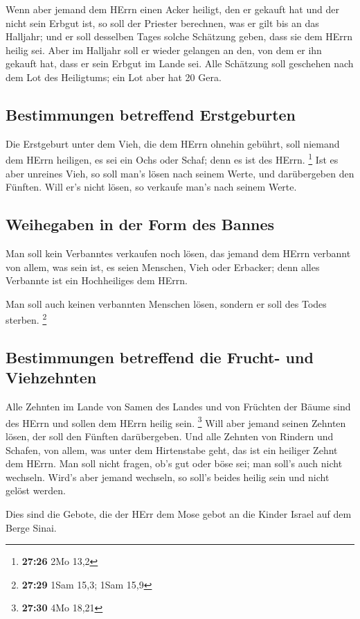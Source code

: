  Wenn aber jemand dem HErrn einen Acker heiligt, den er
gekauft hat und der nicht sein Erbgut ist,  so soll der
Priester berechnen, was er gilt bis an das Halljahr; und er soll
desselben Tages solche Schätzung geben, dass sie dem HErrn heilig sei.
 Aber im Halljahr soll er wieder gelangen an den, von dem
er ihn gekauft hat, dass er sein Erbgut im Lande sei. 
Alle Schätzung soll geschehen nach dem Lot des Heiligtums; ein Lot aber
hat 20 Gera.

\hypertarget{bestimmungen-betreffend-erstgeburten}{%
\subsection{Bestimmungen betreffend
Erstgeburten}\label{bestimmungen-betreffend-erstgeburten}}

 Die Erstgeburt unter dem Vieh, die dem HErrn ohnehin
gebührt, soll niemand dem HErrn heiligen, es sei ein Ochs oder Schaf;
denn es ist des HErrn. \footnote{\textbf{27:26} 2Mo 13,2}
 Ist es aber unreines Vieh, so soll man's lösen nach
seinem Werte, und darübergeben den Fünften. Will er's nicht lösen, so
verkaufe man's nach seinem Werte.

\hypertarget{weihegaben-in-der-form-des-bannes}{%
\subsection{Weihegaben in der Form des
Bannes}\label{weihegaben-in-der-form-des-bannes}}

 Man soll kein Verbanntes verkaufen noch lösen, das
jemand dem HErrn verbannt von allem, was sein ist, es seien Menschen,
Vieh oder Erbacker; denn alles Verbannte ist ein Hochheiliges dem HErrn.

 Man soll auch keinen verbannten Menschen lösen, sondern
er soll des Todes sterben. \footnote{\textbf{27:29} 1Sam 15,3; 1Sam 15,9}

\hypertarget{bestimmungen-betreffend-die-frucht--und-viehzehnten}{%
\subsection{Bestimmungen betreffend die Frucht- und
Viehzehnten}\label{bestimmungen-betreffend-die-frucht--und-viehzehnten}}

 Alle Zehnten im Lande von Samen des Landes und von
Früchten der Bäume sind des HErrn und sollen dem HErrn heilig sein.
\footnote{\textbf{27:30} 4Mo 18,21}  Will aber jemand
seinen Zehnten lösen, der soll den Fünften darübergeben. 
Und alle Zehnten von Rindern und Schafen, von allem, was unter dem
Hirtenstabe geht, das ist ein heiliger Zehnt dem HErrn. 
Man soll nicht fragen, ob's gut oder böse sei; man soll's auch nicht
wechseln. Wird's aber jemand wechseln, so soll's beides heilig sein und
nicht gelöst werden.

 Dies sind die Gebote, die der HErr dem Mose gebot an die
Kinder Israel auf dem Berge Sinai.
